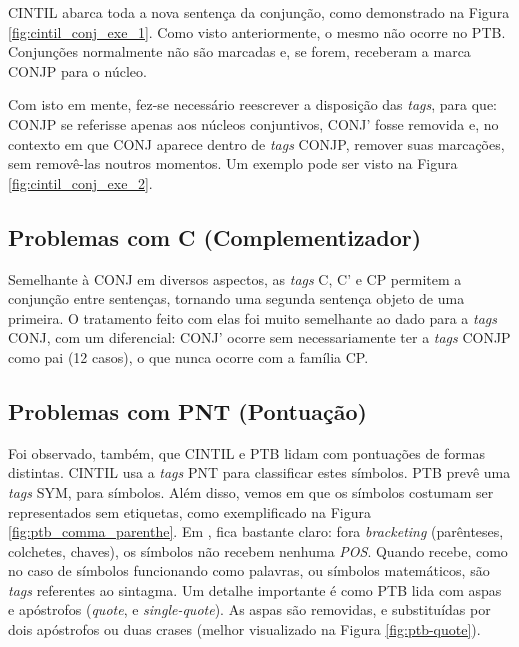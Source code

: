 CINTIL abarca toda a nova sentença da conjunção, como demonstrado na Figura \ref{fig:cintil_conj_exe_1}. Como visto anteriormente, o mesmo não ocorre no PTB. Conjunções normalmente não são marcadas e, se forem, receberam a marca CONJP para o núcleo.
\begin{center}

\end{center}

Com isto em mente, fez-se necessário reescrever a disposição das \textit{tags}, para que: CONJP se referisse apenas aos núcleos conjuntivos, CONJ’ fosse removida e, no contexto em que CONJ aparece dentro de \textit{tags} CONJP, remover suas marcações, sem removê-las noutros momentos. Um exemplo pode ser visto na Figura \ref{fig:cintil_conj_exe_2}.
\begin{center}

\end{center}

\subsection{Problemas com C (Complementizador)}
\label{subsec:cintil-c}

Semelhante à CONJ em diversos aspectos, as \textit{tags} C, C’ e CP permitem a conjunção entre sentenças, tornando uma segunda sentença objeto de uma primeira. O tratamento feito com elas foi muito semelhante ao dado para a \textit{tags} CONJ, com um diferencial: CONJ’ ocorre sem necessariamente ter a \textit{tags} CONJP como pai (12 casos), o que nunca ocorre com a família CP. 

\subsection{Problemas com PNT (Pontuação)}
\label{subsec:cintil-pnt}

Foi observado, também, que CINTIL e PTB lidam com pontuações de formas distintas. CINTIL usa a \textit{tags} PNT para classificar estes símbolos. PTB prevê uma \textit{tags} SYM, para símbolos. Além disso, vemos em \cite[p~52]{buildingPTB} que os símbolos costumam ser representados sem etiquetas, como exemplificado na Figura \ref{fig:ptb_comma_parenthe}. Em \cite[p~52]{bracketing_ptb}, fica bastante claro: fora \textit{bracketing} (parênteses, colchetes, chaves), os símbolos não recebem nenhuma \textit{POS}. Quando recebe, como no caso de símbolos funcionando como palavras, ou símbolos matemáticos, são \textit{tags} referentes ao sintagma. Um detalhe importante é como PTB lida com aspas e apóstrofos (\textit{quote}, e \textit{single-quote}). As aspas são removidas, e substituídas por dois apóstrofos ou duas crases (melhor visualizado na Figura \ref{fig:ptb-quote}).

